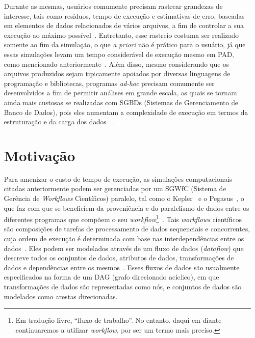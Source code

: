 Durante as mesmas, usuários comumente precisam rastrear grandezas de interesse, tais como resíduos, tempo de execução e estimativas de erro, baseadas em elementos de dados relacionados de vários arquivos, a fim de controlar a sua execução ao máximo possível~\cite{silva2016situ}.
Entretanto, esse rastreio costuma ser realizado somente ao fim da simulação, o que \textit{a priori} não é prático para o usuário, já que essas simulações levam um tempo considerável de execução mesmo em PAD, como mencionado anteriormente~\cite{silva2017raw}. Além disso, mesmo considerando que os arquivos produzidos sejam tipicamente apoiados por diversas linguagens de programação e bibliotecas, programas \textit{ad-hoc} precisam comumente ser desenvolvidos a fim de permitir análises em grande escala, as quais se tornam ainda mais custosas se realizadas com  SGBDs (Sistemas de Gerenciamento de Banco de Dados), pois eles aumentam a complexidade de execução em termos da estruturação e da carga dos dados ~\cite{silva2015analyzing}.

\section{Motivação}%
\label{sec:motivacao}

Para amenizar o custo de tempo de execução, as simulações computacionais citadas anteriormente podem ser gerenciadas por um  SGWfC (Sistema de Gerência de \textit{Workflows} Científicos) paralelo, tal como o Kepler~\cite{ludascher2006scientific} e o Pegasus~\cite{deelman2005pegasus}, o que faz com que se beneficiem da proveniência e do paralelismo de dados entre os diferentes programas que compõem o seu \textit{workflow}\footnote{Em tradução livre, ``fluxo de trabalho''. No entanto, daqui em diante continuaremos a utilizar \textit{workflow}, por ser um termo mais preciso.}~\cite{bux2013parallelization}.
Tais \textit{workflows} científicos são composições de tarefas de processamento de dados sequenciais e concorrentes, cuja ordem de execução é determinada com base nas interdependências entre os dados~\cite{bux2013parallelization}. Eles podem ser modelados através de um fluxo de dados (\textit{dataflow}) que descreve todos os conjuntos de dados, atributos de dados, transformações de dados e dependências entre os mesmos~\cite{silva2017raw}. Esses fluxos de dados são usualmente especificados na forma de um  DAG (grafo direcionado acíclico), em que transformações de dados são representadas como nós, e conjuntos de dados são modelados como arestas direcionadas.

